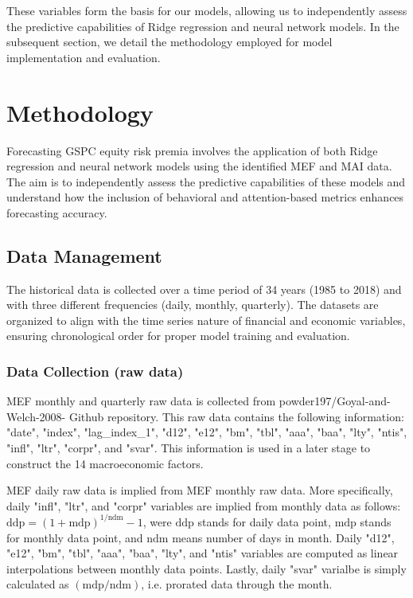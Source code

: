 \documentclass{article}
\begin{document}
These variables form the basis for our models, allowing us to independently assess the predictive capabilities of Ridge regression and neural network models. In the subsequent section, we detail the methodology employed for model implementation and evaluation.

\section{Methodology}

Forecasting GSPC equity risk premia involves the application of both Ridge regression and neural network models using the identified MEF and MAI data. The aim is to independently assess the predictive capabilities of these models and understand how the inclusion of behavioral and attention-based metrics enhances forecasting accuracy.

\subsection{Data Management}

The historical data is collected over a time period of 34 years (1985 to 2018) and with three different frequencies (daily, monthly, quarterly). The datasets are organized to align with the time series nature of financial and economic variables, ensuring chronological order for proper model training and evaluation.

\subsubsection{Data Collection (raw data)}
  
MEF monthly and quarterly raw data is collected from powder197/Goyal-and-Welch-2008- Github repository. This raw data contains the following information: "date", "index", "lag\_index\_1", "d12", "e12", "bm", "tbl", "aaa", "baa", "lty", "ntis", "infl", "ltr", "corpr", and "svar". This information is used in a later stage to construct the 14 macroeconomic factors.

MEF daily raw data is implied from MEF monthly raw data. More specifically, daily "infl", "ltr", and "corpr" variables are implied from monthly data as follows: $\text{ddp} = (1+\text{mdp})^{1/\text{ndm}}-1$, were $\text{ddp}$ stands for daily data point, $\text{mdp}$ stands for monthly data point, and $\text{ndm}$ means number of days in month. 
Daily "d12", "e12", "bm", "tbl", "aaa", "baa", "lty", and "ntis" variables are computed as linear interpolations between monthly data points. Lastly, daily "svar" varialbe is simply calculated as $(\text{mdp}/\text{ndm})$, i.e. prorated data through the month.
\end{document}
